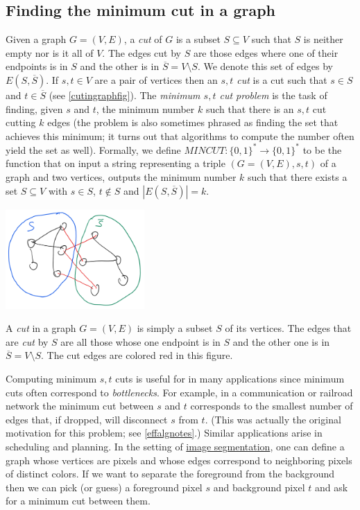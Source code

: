 \subsection{Finding the minimum cut in a graph}\label{mincutsec}

Given a graph \(G=(V,E)\), a \emph{cut} of \(G\) is a subset
\(S \subseteq V\) such that \(S\) is neither empty nor is it all of
\(V\). The edges cut by \(S\) are those edges where one of their
endpoints is in \(S\) and the other is in
\(\overline{S} = V \setminus S\). We denote this set of edges by
\(E(S,\overline{S})\). If \(s,t \in V\) are a pair of vertices then an
\emph{\(s,t\) cut} is a cut such that \(s\in S\) and
\(t\in \overline{S}\) (see \cref{cutingraphfig}). The \emph{minimum
\(s,t\) cut problem} is the task of finding, given \(s\) and \(t\), the
minimum number \(k\) such that there is an \(s,t\) cut cutting \(k\)
edges (the problem is also sometimes phrased as finding the set that
achieves this minimum; it turns out that algorithms to compute the
number often yield the set as well). Formally, we define
\(\ensuremath{\mathit{MINCUT}}:\{0,1\}^* \rightarrow \{0,1\}^*\) to be
the function that on input a string representing a triple
\((G=(V,E),s,t)\) of a graph and two vertices, outputs the minimum
number \(k\) such that there exists a set \(S \subseteq V\) with
\(s\in S\), \(t\not\in S\) and \(|E(S,\overline{S})|=k\).


\begin{marginfigure}
\centering
\includegraphics[width=\linewidth, height=1.5in, keepaspectratio]{../figure/cutingraph.png}
\caption{A \emph{cut} in a graph \(G=(V,E)\) is simply a subset \(S\) of
its vertices. The edges that are \emph{cut} by \(S\) are all those whose
one endpoint is in \(S\) and the other one is in
\(\overline{S} = V \setminus S\). The cut edges are colored red in this
figure.}
\label{cutingraphfig}
\end{marginfigure}

Computing minimum \(s,t\) cuts is useful for in many applications since
minimum cuts often correspond to \emph{bottlenecks}. For example, in a
communication or railroad network the minimum cut between \(s\) and
\(t\) corresponds to the smallest number of edges that, if dropped, will
disconnect \(s\) from \(t\). (This was actually the original motivation
for this problem; see \cref{effalgnotes}.) Similar applications arise in
scheduling and planning. In the setting of
\href{https://en.wikipedia.org/wiki/Image_segmentation}{image
segmentation}, one can define a graph whose vertices are pixels and
whose edges correspond to neighboring pixels of distinct colors. If we
want to separate the foreground from the background then we can pick (or
guess) a foreground pixel \(s\) and background pixel \(t\) and ask for a
minimum cut between them.

